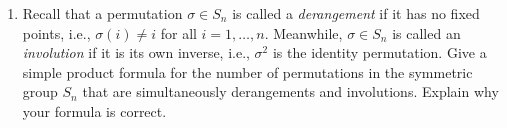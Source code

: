 \documentclass[11pt]{article}
\begin{document}
\begin{enumerate}
\item Recall that a permutation $\sigma \in S_n$ is called a \emph{derangement} if it has no fixed points, i.e., $\sigma(i)\neq i$ for all $i=1,\ldots,n$. Meanwhile, $\sigma \in S_n$ is called an \emph{involution} if it is its own inverse, i.e., $\sigma^2$ is the identity permutation. Give a simple product formula for the number of permutations in the symmetric group $S_n$ that are simultaneously derangements and involutions. Explain why your formula is correct.

\end{enumerate}
\end{document}

